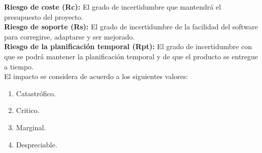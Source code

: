 \textbf{Riesgo de coste (Rc):} El grado de incertidumbre que mantendrá el presupuesto del proyecto. \\

\textbf{Riesgo de soporte (Rs):} El grado de incertidumbre de la facilidad del software para corregirse, adaptarse y ser mejorado. \\

\textbf{Riesgo de la planificación temporal (Rpt):} El grado de incertidumbre con que se podrá mantener la planificación temporal y de que el producto se entregue a tiempo. \\

El impacto se considera de acuerdo a los siguientes valores: \\

\begin{enumerate}
	\item Catastrófico.
	\item Critico.
	\item Marginal.
	\item Despreciable.
\end{enumerate}


